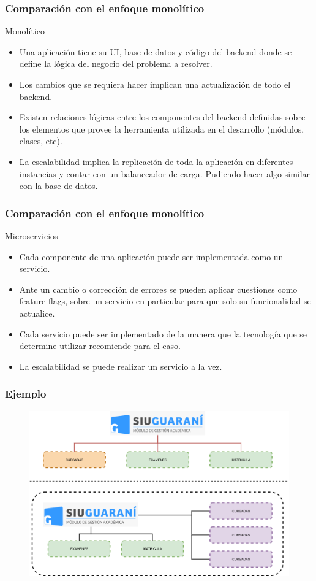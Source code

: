 \documentclass{beamer}
\begin{document}
\begin{frame}
    \frametitle{Comparación con el enfoque monolítico}
	\begin{block}{Monolítico}
	\begin{itemize}
		\item Una aplicación tiene su UI, base de datos y código del backend donde se define la lógica del negocio del problema a resolver.
		\item Los cambios que se requiera hacer implican una actualización de todo el backend.
		\item Existen relaciones lógicas entre los componentes del backend definidas sobre los elementos que provee la herramienta utilizada en el desarrollo (módulos, clases, etc).
		\item La escalabilidad implica la replicación de toda la aplicación en diferentes instancias y contar con un balanceador de carga. Pudiendo hacer algo similar con la base de datos.
	\end{itemize}
  	\end{block}
\end{frame}

\begin{frame}
	\frametitle{Comparación con el enfoque monolítico}
	\begin{block}{Microservicios}
	\begin{itemize}
		\item Cada componente de una aplicación puede ser implementada como un servicio.
		\item Ante un cambio o corrección de errores se pueden aplicar cuestiones como feature flags, sobre un servicio en particular para que solo su funcionalidad se actualice.
		\item Cada servicio puede ser implementado de la manera que la tecnología que se determine utilizar recomiende para el caso.
		\item La escalabilidad se puede realizar un servicio a la vez.
	\end{itemize}
  	\end{block}
\end{frame}

\begin{frame}
	\frametitle{Ejemplo}
	\begin{figure}[htp]
	\centering
	\includegraphics[width=0.95\linewidth]{img/ejemplo-guarani.png}
	\end{figure}
\end{frame}
\end{document}
